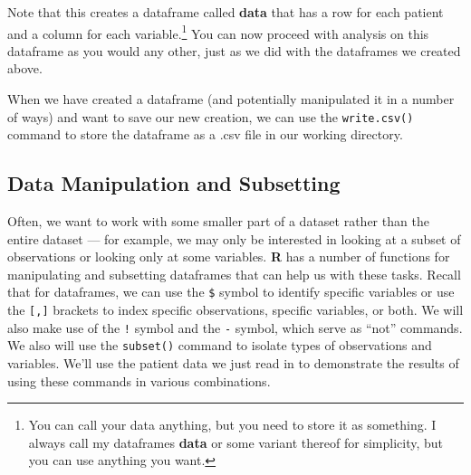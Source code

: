 \documentclass[12pt]{article}\usepackage[]{graphicx}\usepackage[]{color}
\begin{document}
Note that this creates a dataframe called \textbf{data} that has a row for each patient and a column for each variable.\footnote{You can call your data anything, but you need to store it as something. I always call my dataframes \textbf{data} or some variant thereof for simplicity, but you can use anything you want.} You can now proceed with analysis on this dataframe as you would any other, just as we did with the dataframes we created above.

When we have created a dataframe (and potentially manipulated it in a number of ways) and want to save our new creation, we can use the \verb|write.csv()| command to store the dataframe as a .csv file in our working directory.

\subsection{Data Manipulation and Subsetting}
Often, we want to work with some smaller part of a dataset rather than the entire dataset --- for example, we may only be interested in looking at a subset of observations or looking only at some variables. \textbf{R} has a number of functions for manipulating and subsetting dataframes that can help us with these tasks. Recall that for dataframes, we can use the \verb|$| symbol to identify specific variables or use the \verb|[,]| brackets to index specific observations, specific variables, or both. We will also make use of the \verb|!| symbol and the \verb|-| symbol, which serve as ``not'' commands. We also will use the \verb|subset()| command to isolate types of observations and variables. We'll use the patient data we just read in to demonstrate the results of using these commands in various combinations.
\end{document}
